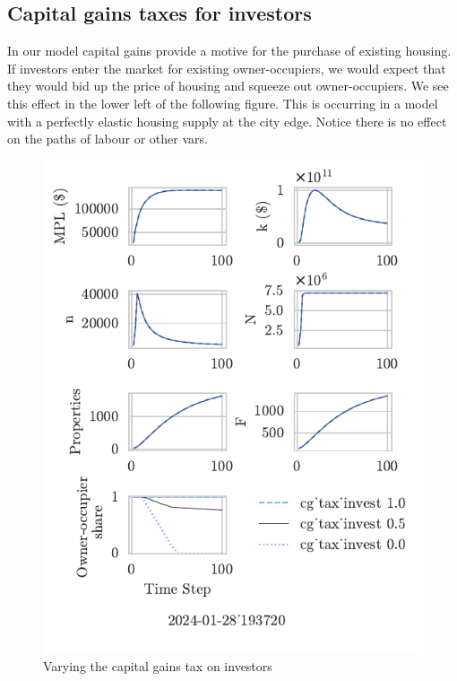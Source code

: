 \documentclass{article}
\begin{document}
\newpage %
\subsection{Capital gains taxes for investors}
In our model capital gains provide a motive for the purchase of existing housing. If investors enter the market for existing owner-occupiers, we would expect that they would bid up the price of housing and squeeze out owner-occupiers. We see this effect in the lower left of the following figure. This is occurring in a model with a perfectly elastic housing supply at the city edge. Notice there is no effect on the paths of labour or other vars.
\begin{figure}
    \centering
    \includegraphics{fig/Analysis/cg_tax_invest-[1- 0.5-0.0]_193720.pdf}
    \caption{Varying the capital gains tax on investors}
    \label{fig:enter-label}
\end{figure}
\end{document}
